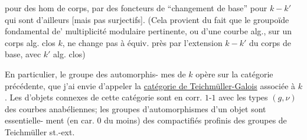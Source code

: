 pour des hom de corps, par des foncteurs
de ``changement de base'' pour $k\mathbin{-}k'$
qui sont d'ailleurs   [mais
pas  surjectifs]. (Cela provient
du fait que le groupoïde fondamental
de'   multiplicité modulaire pertinente,
ou d'une courbe alg., sur un corps alg.
clos $k$, ne change pas à équiv. près
par l'extension $k\mathbin{-}k'$ du corps de base,
avec $k'$ alg. clos) 

En particulier, le groupe des automorphis-
mes de $k$ opère sur la catégorie précédente,
que j'ai envie d'appeler la \uline{catégorie de
Teichmüller-Galois} associée à $k$. Les
  d'objets connexes de cette
catégorie sont en corr. $1$-$1$ avec les types
$(g,\nu)$ des courbes anabéliennes; les groupes
d'automorphismes d'un objet sont essentielle-
ment (en car. $0$ du moins) des compactifiés
profinis des groupes de Teichmüller st.-ext.
